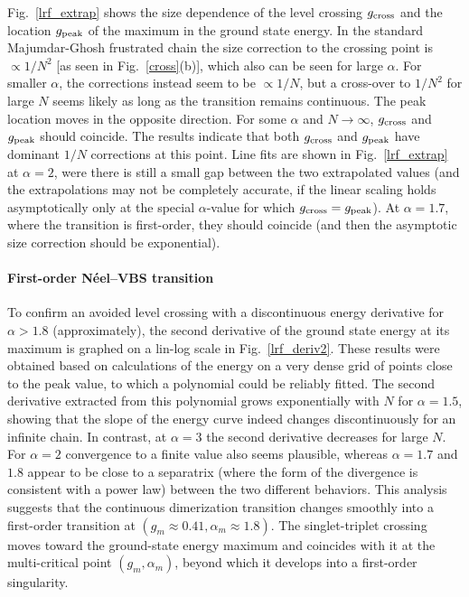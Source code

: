 \documentclass[draft,numberedheadings]{aipproc}
\begin{document}
Fig.~\ref{lrf_extrap} shows the size dependence of the level crossing $g_{\rm cross}$ and the location $g_{\rm peak}$ of the maximum in the 
ground state energy. In the standard Majumdar-Ghosh frustrated chain the size correction to the crossing point is $\propto 1/N^2$ [as seen in 
Fig.~\ref{cross}(b)], which also can be seen for large $\alpha$. For smaller $\alpha$, the corrections instead seem to be  $\propto 1/N$, but a 
cross-over to $1/N^2$ for large $N$ seems likely as long as the transition remains continuous.  The peak location moves in the opposite direction. 
For some $\alpha$ and $N\to \infty$, $g_{\rm cross}$ and $g_{\rm peak}$ should coincide. The results indicate that both $g_{\rm cross}$ and $g_{\rm peak}$ 
have dominant $1/N$ corrections at this point. Line fits are shown in Fig.~\ref{lrf_extrap} at $\alpha=2$, were there is still a small gap between 
the two extrapolated values (and the extrapolations may not be completely accurate, if the linear scaling holds asymptotically only at the special 
$\alpha$-value for which $g_{\rm cross}=g_{\rm peak}$). At $\alpha=1.7$, where the transition is first-order, they should coincide (and then the asymptotic 
size correction should be exponential).

\paragraph{First-order N\'eel--VBS transition}

To confirm an avoided level crossing with a discontinuous energy derivative for $\alpha > 1.8$ (approximately), the second derivative of the ground 
state energy at its maximum is graphed on a lin-log scale in Fig.~\ref{lrf_deriv2}. These results were obtained based on calculations of the energy on a very 
dense grid of points close to the peak value, to which a polynomial could be reliably fitted. The second derivative extracted from this polynomial grows exponentially 
with $N$ for $\alpha=1.5$, showing that the slope of the energy curve indeed changes discontinuously for an infinite chain. In contrast, at $\alpha=3$ 
the second derivative decreases for large $N$. For $\alpha=2$ convergence to a finite value also seems plausible, whereas $\alpha=1.7$ and $1.8$ appear 
to be close to a separatrix (where the form of the divergence is consistent with a power law) between the two different behaviors. This analysis suggests 
that the continuous dimerization transition changes smoothly into a first-order transition at $(g_m \approx 0.41,\alpha_m \approx 1.8)$. The singlet-triplet 
crossing moves toward the ground-state energy maximum and coincides with it at the multi-critical point $(g_m,\alpha_m)$, beyond which it develops into 
a first-order singularity. 
\end{document}
